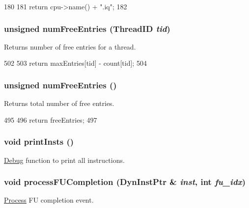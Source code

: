 \begin{DoxyCode}
180 {
181     return cpu->name() + ".iq";
182 }
\end{DoxyCode}
\hypertarget{classInstructionQueue_acc878f608deead5b5319a6a3f98b50c8}{
\subsubsection[{numFreeEntries}]{\setlength{\rightskip}{0pt plus 5cm}unsigned numFreeEntries ({\bf ThreadID} {\em tid})}}
\label{classInstructionQueue_acc878f608deead5b5319a6a3f98b50c8}
Returns number of free entries for a thread. 


\begin{DoxyCode}
502 {
503     return maxEntries[tid] - count[tid];
504 }
\end{DoxyCode}
\hypertarget{classInstructionQueue_a028971a565aca048c67ea1c36a6a9d51}{
\subsubsection[{numFreeEntries}]{\setlength{\rightskip}{0pt plus 5cm}unsigned numFreeEntries ()}}
\label{classInstructionQueue_a028971a565aca048c67ea1c36a6a9d51}
Returns total number of free entries. 


\begin{DoxyCode}
495 {
496     return freeEntries;
497 }
\end{DoxyCode}
\hypertarget{classInstructionQueue_afc9c0c90c27fe0dc8bd4da915596bc21}{
\subsubsection[{printInsts}]{\setlength{\rightskip}{0pt plus 5cm}void printInsts ()}}
\label{classInstructionQueue_afc9c0c90c27fe0dc8bd4da915596bc21}
\hyperlink{namespaceDebug}{Debug} function to print all instructions. \hypertarget{classInstructionQueue_ad118e191396cf75b93afd066a6a3f486}{
\subsubsection[{processFUCompletion}]{\setlength{\rightskip}{0pt plus 5cm}void processFUCompletion ({\bf DynInstPtr} \& {\em inst}, \/  int {\em fu\_\-idx})}}
\label{classInstructionQueue_ad118e191396cf75b93afd066a6a3f486}
\hyperlink{classProcess}{Process} FU completion event. 


